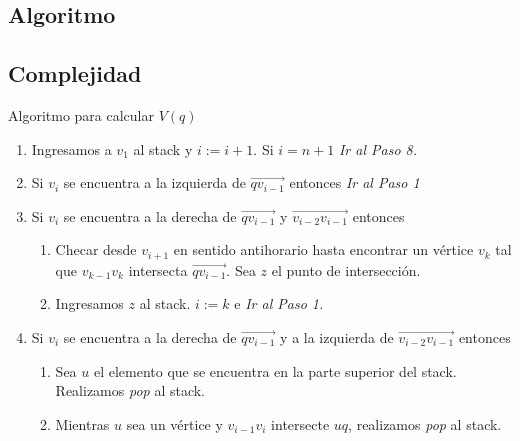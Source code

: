 \documentclass[aspectratio=169,xcolor=dvipsnames, t]{beamer}
\begin{document}

\subsection{Algoritmo}
\subsection{Complejidad}

\begin{frame}{Algoritmo para calcular $V(q)$}
  \begin{enumerate}
  \item Ingresamos a $v_{1}$ al stack y $i := i + 1$. Si $i = n + 1$ \textit{Ir al Paso 8.}
  \item Si $v_{i}$ se encuentra a la izquierda de $\overrightarrow{qv_{i-1}}$ entonces \textit{Ir al Paso 1}
  \item Si $v_{i}$ se encuentra a la derecha de $\overrightarrow{qv_{i-1}}$ y $\overrightarrow{v_{i-2}v_{i-1}}$ entonces
    \begin{enumerate}
    \item Checar desde $v_{i+1}$ en sentido antihorario hasta encontrar un vértice $v_{k}$ tal que $v_{k-1}v_{k}$ intersecta $\overrightarrow{qv_{i-1}}$. Sea $z$ el punto de intersección.
    \item Ingresamos $z$ al stack. $i := k$ e \textit{Ir al Paso 1.}
    \end{enumerate}
  \item Si $v_{i}$ se encuentra a la derecha de $\overrightarrow{qv_{i-1}}$ y a la izquierda de $\overrightarrow{v_{i-2}v_{i-1}}$ entonces
    \begin{enumerate}
    \item Sea $u$ el elemento que se encuentra en la parte superior del stack. Realizamos \textit{pop} al stack.
    \item Mientras $u$ sea un vértice y $v_{i-1}v_{i}$ intersecte $uq$, realizamos \textit{pop} al stack. 
    \end{enumerate}
  \end{enumerate}
\end{frame}
\end{document}

